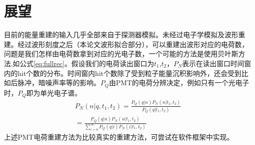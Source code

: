 \section{展望}

目前的能量重建的输入几乎全部来自于探测器模拟。未经过电子学模拟及波形重建。经过波形刻度之后（本论文波形拟合部分），可以重建出波形对应的电荷数，问题是我们怎样由电荷数拿到对应的光电子数，一个可能的方法是使用贝叶斯方法,如公式\ref{eq:fullrec}。假设我们的电荷读出窗口为$t_1$,$t_2$，$P_N$表示在读出窗口时间窗内的hit个数的分布。时间窗内hit个数除了受到粒子能量沉积影响外，还会受到比如后脉冲，暗噪声率等的影响。$P_Q$由PMT的电荷分辨决定，例如只有一个光电子时，$P_Q$即为单光电子谱。
\begin{eqnarray}\label{eq:fullrec}
P_{N}(n|q,t_1,t_2)=\frac{P_Q(q|n)P_N(n|t_1,t_2)}{P_Q(q|t_1,t_2)}\\
=\frac{P_Q(q|n)P_N(n|t_1,t_2)}{\sum_{i=0}^{\infty}P_Q(q|i)P_N(i|t_1,t_2)}   \nonumber
\end{eqnarray}
上述PMT电荷重建方法为比较真实的重建方法，可尝试在软件框架中实现。
